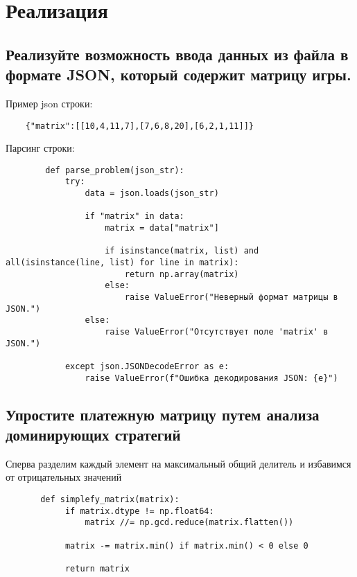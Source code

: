 \documentclass{article}
\begin{document}
\section{Реализация}

\subsection{Реализуйте возможность ввода данных из файла в формате JSON, который содержит матрицу игры.}

Пример json строки:
\begin{listing}[H]
    \begin{verbatim}
    {"matrix":[[10,4,11,7],[7,6,8,20],[6,2,1,11]]}
    \end{verbatim}
\end{listing}

Парсинг строки:

\begin{listing}[H]
    \begin{verbatim}
        def parse_problem(json_str):
            try:
                data = json.loads(json_str)

                if "matrix" in data:
                    matrix = data["matrix"]

                    if isinstance(matrix, list) and all(isinstance(line, list) for line in matrix):
                        return np.array(matrix)
                    else:
                        raise ValueError("Неверный формат матрицы в JSON.")
                else:
                    raise ValueError("Отсутствует поле 'matrix' в JSON.")

            except json.JSONDecodeError as e:
                raise ValueError(f"Ошибка декодирования JSON: {e}")
        \end{verbatim}
\end{listing}

\subsection{Упростите платежную матрицу путем анализа доминирующих стратегий}

Сперва разделим каждый элемент на максимальный общий делитель и избавимся от отрицательных значений

\begin{listing}[H]
    \begin{verbatim}
       def simplefy_matrix(matrix):
            if matrix.dtype != np.float64:
                matrix //= np.gcd.reduce(matrix.flatten())
            
            matrix -= matrix.min() if matrix.min() < 0 else 0

            return matrix
    \end{verbatim}
\end{listing}
\end{document}

